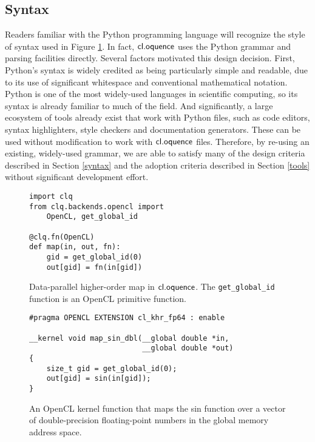 \documentclass[10pt, conference, compsocconf]{IEEEtran}
\begin{document}
\subsection{Syntax}
Readers familiar with the Python programming language will recognize the style of syntax used in Figure \ref{map}. In fact, $\textsf{cl.oquence}$ uses the Python grammar and parsing facilities directly. Several factors motivated this design decision. First, Python's syntax is widely credited as being particularly simple and readable, due to its use of significant whitespace and conventional mathematical notation. Python is one of the most widely-used languages in scientific computing, so its syntax is already familiar to much of the field. And significantly, a large ecosystem of tools already exist that work with Python files, such as code editors, syntax highlighters, style checkers and documentation generators. These can be used without modification to work with $\textsf{cl.oquence}$ files. Therefore, by re-using an existing, widely-used grammar, we are able to satisfy many of the design criteria described in Section \ref{syntax} and the adoption criteria described in Section \ref{tools} without significant development effort.

\begin{figure}
\small{
\begin{verbatim}
import clq
from clq.backends.opencl import 
    OpenCL, get_global_id

@clq.fn(OpenCL)
def map(in, out, fn):
    gid = get_global_id(0)
    out[gid] = fn(in[gid])
\end{verbatim}}
\caption{Data-parallel higher-order map in $\textsf{cl.oquence}$. The \texttt{get\_global\_id} function is an OpenCL primitive function.}
\label{map}

\end{figure}

\begin{figure}
\small{\begin{verbatim}
#pragma OPENCL EXTENSION cl_khr_fp64 : enable

__kernel void map_sin_dbl(__global double *in, 
                          __global double *out) 
{
    size_t gid = get_global_id(0);
    out[gid] = sin(in[gid]);
}
\end{verbatim}}
\caption{An OpenCL kernel function that maps the sin function over a vector of double-precision floating-point numbers in the global memory address space.}
\label{mapsinint}
\end{figure}
\end{document}
